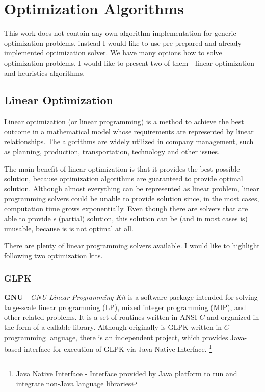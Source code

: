 
\section{Optimization Algorithms}\label{sec:optimization-algorithms}

This work does not contain any own algorithm implementation for generic optimization problems,
instead I would like to use pre-prepared and already implemented optimization solver.
We have many options how to solve optimization problems, I would like to present two of them
- linear optimization and heuristics algorithms.

\subsection{Linear Optimization}\label{subsec:linear-optimization}
Linear optimization (or linear programming) is a method to achieve the best outcome in a mathematical model
whose requirements are represented by linear relationships\cite{web_wiki:linearProgramming}.
The algorithms are widely utilized in company management, such as planning, production, transportation, technology and other issues.

The main benefit of linear optimization is that it provides the best possible solution,
because optimization algorithms are guaranteed to provide optimal solution.
Although almost everything can be represented as linear problem,
linear programming solvers could be unable to provide solution since, in the most cases, computation time grows exponentially.
Even though there are solvers that are able to provide $\epsilon$ (partial) solution,
this solution can be (and in most cases is) unusable, because is is not optimal at all.

\medskip
\noindent There are plenty of linear programming solvers available.
I would like to highlight following two optimization kits.

\subsubsection{GLPK}
\textbf{GNU} - \textit{GNU Linear Programming Kit} is a software package intended for solving large-scale linear programming (LP),
mixed integer programming (MIP), and other related problems.
It is a set of routines written in ANSI $C$ and organized in the form of a callable library\cite{web:gnuGlpk}.
Although originally is GLPK written in $C$ programming language,
there is an independent project,
which provides Java-based interface for execution of GLPK via Java Native Interface.
\footnote{Java Native Interface - Interface provided by Java platform to run and integrate non-Java language libraries}

